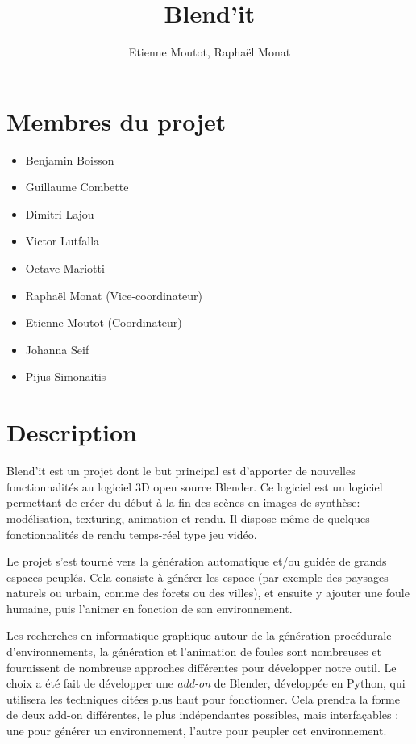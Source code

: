 \documentclass[a4paper,12pt]{article}
\title{Blend'it}
\author{Etienne Moutot, Raphaël Monat}
\begin{document}
\maketitle

\section{Membres du projet}
  \begin{itemize}
    \item Benjamin Boisson
    \item Guillaume Combette
    \item Dimitri Lajou
    \item Victor Lutfalla
    \item Octave Mariotti
    \item Raphaël Monat (Vice-coordinateur)
    \item Etienne Moutot (Coordinateur)
    \item Johanna Seif
    \item Pijus Simonaitis
  \end{itemize}

\section{Description}
Blend'it est un projet dont le but principal est d'apporter de nouvelles fonctionnalités au logiciel 3D open source Blender\cite{Blender}. Ce logiciel est un logiciel permettant de créer du début à la fin des scènes en images de synthèse: modélisation, texturing, animation et rendu. Il dispose même de quelques fonctionnalités de rendu temps-réel type jeu vidéo.

Le projet s'est tourné vers la génération automatique et/ou guidée de grands espaces peuplés. Cela consiste à générer les espace (par exemple des paysages naturels ou urbain, comme des forets ou des villes), et ensuite y ajouter une foule humaine, puis l'animer en fonction de son environnement.

Les recherches en informatique graphique autour de la génération procédurale d'environnements, la génération et  l'animation de foules sont nombreuses et fournissent de nombreuse approches différentes pour développer notre outil. Le choix a été fait de développer une \textit{add-on} de Blender, développée en Python, qui utilisera les techniques citées plus haut pour fonctionner. Cela prendra la forme de deux add-on différentes, le plus indépendantes possibles, mais interfaçables : une pour générer un environnement, l'autre pour peupler cet environnement.
\end{document}
